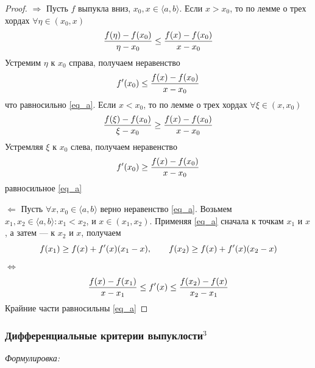 \documentclass{article}
\begin{document}
\begin{proof}
\item{$\Rightarrow$}
Пусть $f$ выпукла вниз, $x_0, x \in \langle a, b\rangle$.
Если $x > x_0$, то по лемме о трех хордах $\forall \eta \in (x_0, x)$
\begin{equation}
\frac{f(\eta) - f(x_0)} {\eta - x_0} \leq \frac{f(x) - f(x_0)} {x - x_0} \notag
\end{equation}
Устремим $\eta$ к $x_0$ справа, получаем неравенство
\begin{equation}
f'(x_0) \leq \frac{f(x) - f(x_0)} {x -x_0} \notag
\end{equation}
что равносильно \eqref{eq_a}.
Если $x < x_0$, то по лемме о трех хордах $\forall \xi \in (x, x_0)$
\begin{equation}
\frac{f(\xi) - f(x_0)} {\xi - x_0} \geq \frac{f(x) - f(x_0)} {x - x_0}\notag
\end{equation}
Устремляя $\xi$ к $x_0$ слева, получаем неравенство
\begin{equation}
f'(x_0) \geq \frac{f(x) - f(x_0)} {x - x_0}\notag
\end{equation}
равносильное \eqref{eq_a}
\item{$\Leftarrow$}
Пусть $\forall x, x_0 \in \langle a, b\rangle$ верно неравенство \eqref{eq_a}. Возьмем $x_1, x_2 \in \langle a, b\rangle: x_1 < x_2$, и $x \in (x_1, x_2)$. Применяя \eqref{eq_a} сначала к точкам $x_1$ и $x$, а затем --- к $x_2$ и $x$, получаем
\begin{equation}
f(x_1) \geq f(x) + f'(x)(x_1 - x), \qquad f(x_2) \geq f(x) + f'(x)(x_2 - x)\notag
\end{equation}
$\Leftrightarrow$
\begin{equation}
\frac{f(x) - f(x_1)} {x - x_1} \leq f'(x) \leq \frac{f(x_2) - f(x)} {x_2 - x_1}\notag
\end{equation}
Крайние части равносильны \eqref{eq_a}
\end{proof}

\subsubsection{Дифференциальные критерии выпуклости\texorpdfstring{$^3$}{}}
\textit{Формулировка: }
\end{document}
